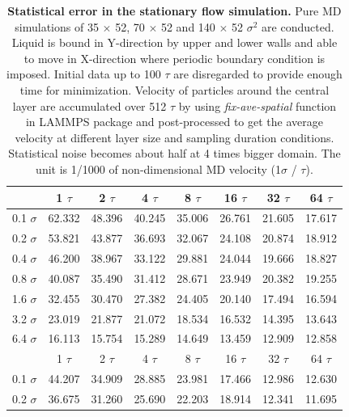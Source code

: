 \documentclass[preprint,12pt]{elsarticle}
\begin{document}
\begin{table}
  \caption{\small {\bf Statistical error in the stationary flow simulation.} Pure MD simulations of 35 $\times$ 52, 70 $\times$ 52 and 140 $\times$ 52 ${\sigma}^2$ are conducted. Liquid is bound in Y-direction by upper and lower walls and able to move in X-direction where periodic boundary condition is imposed. Initial data up to 100 $\tau$ are disregarded to provide enough time for minimization. Velocity of particles around the central layer are accumulated over 512 $\tau$ by using {\it{fix-ave-spatial}} function in LAMMPS package and post-processed to get the average velocity at different layer size and sampling duration conditions. Statistical noise becomes about half at 4 times bigger domain. The unit is 1/1000 of non-dimensional MD velocity (1$\sigma$ / $\tau$).}
  \label{table:MD_Vel0}
  \centering
\footnotesize
  \begin{tabular}{c || c c c c c c c}
\hline
	&	1 $\tau$	&	2 $\tau$	&	4 $\tau$	&	8 $\tau$	&	16 $\tau$	 &	32 $\tau$	&	64 $\tau$	\\
\hline
0.1 $\sigma$	&	62.332 	&	48.396 	&	40.245 	&	35.006 	&	26.761 	&	 21.605 	&	17.617 	\\
0.2 $\sigma$	&	53.821 	&	43.877 	&	36.693 	&	32.067 	&	24.108 	&	 20.874 	&	18.912 	\\
0.4 $\sigma$	&	46.200 	&	38.967 	&	33.122 	&	29.881 	&	24.044 	&	 19.666 	&	18.827 	\\
0.8 $\sigma$	&	40.087 	&	35.490 	&	31.412 	&	28.671 	&	23.949 	&	 20.382 	&	19.255 	\\
1.6 $\sigma$	&	32.455 	&	30.470 	&	27.382 	&	24.405 	&	20.140 	&	 17.494 	&	16.594 	\\
3.2 $\sigma$	&	23.019 	&	21.877 	&	21.072 	&	18.534 	&	16.532 	&	 14.395 	&	13.643 	\\
6.4 $\sigma$	&	16.113 	&	15.754 	&	15.289 	&	14.649 	&	13.459 	&	 12.909 	&	12.858 	\\
\hline
\hline
	&	1 $\tau$	&	2 $\tau$	&	4 $\tau$	&	8 $\tau$	&	16 $\tau$	 &	32 $\tau$	&	64 $\tau$	\\
\hline
0.1 $\sigma$	&	44.207 	&	34.909 	&	28.885 	&	23.981 	&	17.466 	&	 12.986 	&	12.630 	\\
0.2 $\sigma$	&	36.675 	&	31.260 	&	25.690 	&	22.203 	&	18.914 	&	 12.341 	&	11.695 	\\

\end{tabular}
\end{table}
\end{document}
